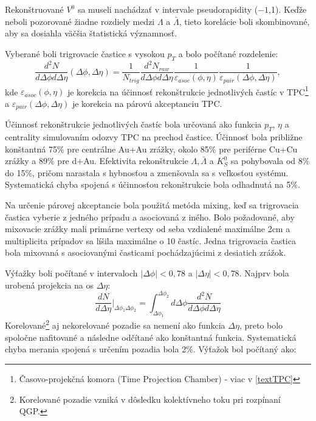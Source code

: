 \documentclass[thesismargins, thesislinespacing]{rnthesis}
\begin{document}
Rekonštruované $V^0$ sa museli nachádzať v intervale pseudorapidity ($-1$,1). Keďže neboli pozorované žiadne rozdiely medzi $\Lambda$ a $\bar{\Lambda}$, tieto korelácie boli skombinované, aby sa dosiahla väčšia štatistická významnosť.

Vyberané boli trigrovacie častice s vysokou $p_T$ a bolo počítané rozdelenie:
\begin{equation}
\frac{d^2N}{d\Delta \phi d\Delta \eta}(\Delta\phi,\Delta\eta) = \frac{1}{N_{trig}}\frac{d^2N_{raw}}{d\Delta \phi d\Delta \eta}\frac{1}{\varepsilon_{asoc}(\phi,\eta)}\frac{1}{\varepsilon_{pair}(\Delta\phi,\Delta\eta)},
\end{equation}
kde $\varepsilon_{asoc}(\phi,\eta)$ je korekcia na účinnosť rekonštrukcie jednotlivých častíc v TPC\footnote{Časovo-projekčná komora (Time Projection Chamber) - viac v \ref{textTPC}} a $\varepsilon_{pair}(\Delta\phi,\Delta\eta)$ je korekcia na párovú akceptanciu TPC. 

Účinnosť rekonštrukcie jednotlivých častíc bola určovaná ako funkcia $p_T$, $\eta$ a centrality simulovaním odozvy TPC na prechod častice. Účinnosť bola približne konštantná 75\% pre centrálne Au+Au zrážky, okolo 85\% pre periférne Cu+Cu zrážky a 89\% pre d+Au. Efektivita rekonštrukcie $\Lambda, \bar{\Lambda}$ a $K^0_S$ sa pohybovala od 8\% do 15\%, pričom narastala s hybnosťou a zmenšovala sa s veľkosťou systému. Systematická chyba spojená s účinnosťou rekonštrukcie bola odhadnutá na 5\%.

Na určenie párovej akceptancie bola použitá metóda mixing, keď sa trigrovacia častica vyberie z jedného prípadu a asociovaná z iného. Bolo požadované, aby mixovacie zrážky mali primárne vertexy od seba vzdialené maximálne 2cm a multiplicita prípadov sa líšila maximálne o 10 častíc. Jedna trigrovacia častica bola mixovaná s asociovanými časticami pochádzajúcimi z desiatich zrážok.

Výťažky boli počítané v intervaloch $|\Delta\phi|<0,78$ a $|\Delta\eta|<0,78$. Najprv bola urobená projekcia na os $\Delta\eta$:
\begin{equation}
\frac{dN}{d\Delta\eta}|_{\Delta\phi_1 \Delta\phi_2}= \int_{\Delta\phi_1}^{\Delta\phi_2}d\Delta\phi \frac{d^2N}{d\Delta \phi d\Delta \eta}
\end{equation}
Korelované\footnote{Korelované pozadie vzniká v dôsledku kolektívneho toku pri rozpínaní QGP.} aj nekorelované pozadie sa nemení ako funkcia $\Delta \eta$, preto bolo spoločne nafitované a následne odčítané ako konštantná funkcia. Systematická chyba merania spojená s určením pozadia bola 2\%. Výťažok bol počítaný ako:
\end{document}
